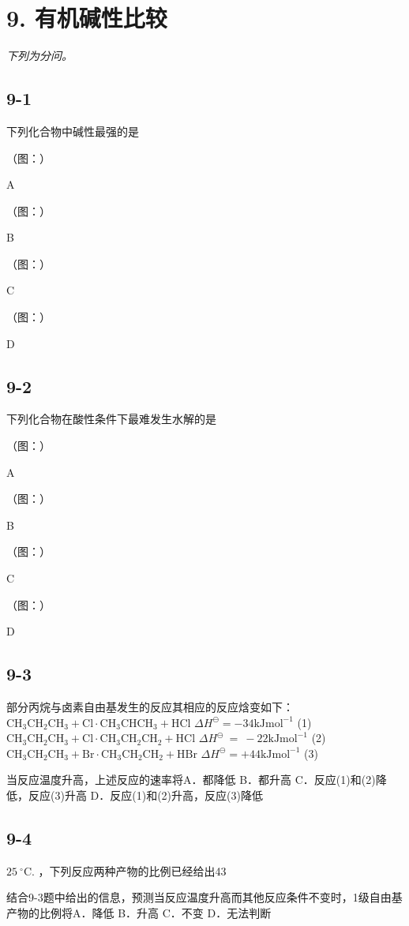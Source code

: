 \section*{9. 有机碱性比较}
\textit{下列为分问。}

\subsection*{9-1}
下列化合物中碱性最强的是

（图：）

A

（图：）

B

（图：）

C

（图：）

D

\subsection*{9-2}
下列化合物在酸性条件下最难发⽣⽔解的是

（图：）

A

（图：）

B

（图：）

C

（图：）

D

\subsection*{9-3}
部分丙烷与⻧素⾃由基发⽣的反应其相应的反应焓变如下：$\mathrm { C H _ { 3 } C H _ { 2 } C H _ { 3 } + C l \cdot  C H _ { 3 } C H C H _ { 3 } + H C l }$ $\Delta H ^ { \ominus } = - 3 4 \mathrm { k J } \mathrm { m o l ^ { - 1 } }$ (1)$\mathrm { C H _ { 3 } C H _ { 2 } C H _ { 3 } + C l \cdot  C H _ { 3 } C H _ { 2 } C H _ { 2 } + H C l }$ $\Delta { H ^ { \ominus } } \ = \ - 2 2 \mathrm { k J } \mathrm { m o l ^ { - 1 } }$ (2)$\mathrm { C H _ { 3 } C H _ { 2 } C H _ { 3 } } + \mathrm { B r } \cdot  \mathrm { C H _ { 3 } C H _ { 2 } C H _ { 2 } } + \mathrm { H B r }$ $\Delta H ^ { \ominus } = + 4 4 \mathrm { k J m o l ^ { - 1 } }$ (3)

当反应温度升⾼，上述反应的速率将A．都降低 B．都升⾼ C．反应(1)和(2)降低，反应(3)升⾼ D．反应(1)和(2)升⾼，反应(3)降低

\subsection*{9-4}
$2 5 ~ ^ { \circ } \mathrm { C } .$ ，下列反应两种产物的⽐例已经给出43%

结合9-3题中给出的信息，预测当反应温度升⾼⽽其他反应条件不变时，1级⾃由基产物的⽐例将A．降低 B．升⾼ C．不变 D．⽆法判断
